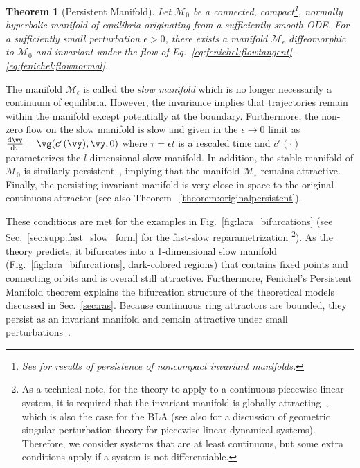 \documentclass{article} %
\newcommand{\pscomment}[1]{\textcolor{BurntOrange}{(#1)}}
\newcounter{ct}
\newcommand{\dm}[1]{\ensuremath{\mathrm{d}{#1}}} %
\newcommand{\RN}[2]{\frac{\dm{#1}}{\dm{#2}}} %
\newcommand{\manifold}{\mathcal{M}}
\newtheorem{theorem}{Theorem}
\theoremstyle{definition}
\theoremstyle{remark}
\begin{document}
\setlength\belowcaptionskip{2ex}

\begin{theorem}[Persistent Manifold]\label{theorem:persistent}
Let \(\manifold_{0}\) be a connected, compact\footnote{See \citet{eldering2013normally} for results of persistence of noncompact invariant manifolds.}, normally hyperbolic manifold of equilibria originating from a sufficiently smooth ODE.
For a sufficiently small perturbation \(\epsilon > 0\), there exists a manifold \(\manifold_{\epsilon}\) diffeomorphic to \(\manifold_{0}\) and  invariant under the flow of Eq.~\eqref{eq:fenichel:flowtangent}-\eqref{eq:fenichel:flownormal}. %
\end{theorem}

The manifold \(\manifold_{\epsilon}\) is called the \emph{slow manifold} which is no longer necessarily a continuum of equilibria.
However, the  invariance implies that trajectories remain within the manifold except potentially at the boundary. %
Furthermore, the non-zero flow on the slow manifold is slow and given in the \(\epsilon \to 0\) limit as \(\RN{\vy}{\tau} = \vg(c^{\epsilon}(\vy), \vy, 0)\) where \(\tau = \epsilon t\) is a rescaled time and \(c^{\epsilon}(\cdot)\) parameterizes the \(l\) dimensional slow manifold.
In addition, the stable manifold of \(\manifold_{0}\) is similarly persistent~\cite{Jones1995}, implying that the manifold \(\manifold_{\epsilon}\) remains attractive.
Finally, the persisting invariant manifold is very close in space to the original continuous attractor (see also Theorem ~\ref{theorem:originalpersistent}).


These conditions are met for the examples in Fig.~\ref{fig:lara_bifurcations} (see Sec.~\ref{sec:supp:fast_slow_form} for the fast-slow reparametrization%
	\footnote{As a technical note, for the theory to apply to a continuous piecewise-linear system, it is required that the invariant manifold is globally attracting~\cite{simpson2018}, which is also the case for the BLA (see also \citep{prohens2013canard,prohens2016slow} for a discussion of geometric singular perturbation theory for piecewise linear dynamical systems). Therefore, we consider systems that are at least continuous, but some extra conditions apply if a system is not differentiable.}).%
As the theory predicts, it bifurcates into a 1-dimensional slow manifold (Fig.~\ref{fig:lara_bifurcations}, dark-colored regions) that contains fixed points and connecting orbits and is overall still attractive.
Furthermore, Fenichel's Persistent Manifold theorem explains the bifurcation structure of the theoretical models discussed in Sec.~\ref{sec:ras}.
Because continuous ring attractors are bounded, they persist as an invariant manifold and remain attractive under small perturbations~\citep{wiggins1994}.
\end{document}
